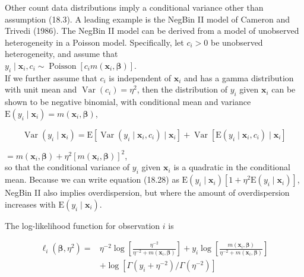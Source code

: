 \documentclass[10pt]{article}
\begin{document}
Other count data distributions imply a conditional variance other than assumption (18.3). A leading example is the NegBin II model of Cameron and Trivedi (1986). The NegBin II model can be derived from a model of unobserved heterogeneity in a Poisson model. Specifically, let $c_{i}>0$ be unobserved heterogeneity, and assume that\\
$y_{i} \mid \mathbf{x}_{i}, c_{i} \sim \operatorname{Poisson}\left[c_{i} m\left(\mathbf{x}_{i}, \boldsymbol{\beta}\right)\right]$.\\
If we further assume that $c_{i}$ is independent of $\mathbf{x}_{i}$ and has a gamma distribution with unit mean and $\operatorname{Var}\left(c_{i}\right)=\eta^{2}$, then the distribution of $y_{i}$ given $\mathbf{x}_{i}$ can be shown to be negative binomial, with conditional mean and variance\\
$\mathrm{E}\left(y_{i} \mid \mathbf{x}_{i}\right)=m\left(\mathbf{x}_{i}, \boldsymbol{\beta}\right)$,


\begin{equation*}
\operatorname{Var}\left(y_{i} \mid \mathbf{x}_{i}\right)=\mathrm{E}\left[\operatorname{Var}\left(y_{i} \mid \mathbf{x}_{i}, c_{i}\right) \mid \mathbf{x}_{i}\right]+\operatorname{Var}\left[\mathrm{E}\left(y_{i} \mid \mathbf{x}_{i}, c_{i}\right) \mid \mathbf{x}_{i}\right] \tag{18.27}
\end{equation*}


$=m\left(\mathbf{x}_{i}, \boldsymbol{\beta}\right)+\eta^{2}\left[m\left(\mathbf{x}_{i}, \boldsymbol{\beta}\right)\right]^{2}$,\\
so that the conditional variance of $y_{i}$ given $\mathbf{x}_{i}$ is a quadratic in the conditional mean. Because we can write equation (18.28) as $\mathrm{E}\left(y_{i} \mid \mathbf{x}_{i}\right)\left[1+\eta^{2} \mathrm{E}\left(y_{i} \mid \mathbf{x}_{i}\right)\right]$, NegBin II also implies overdispersion, but where the amount of overdispersion increases with $\mathrm{E}\left(y_{i} \mid \mathbf{x}_{i}\right)$.

The log-likelihood function for observation $i$ is


\begin{align*}
\ell_{i}\left(\boldsymbol{\beta}, \eta^{2}\right)= & \eta^{-2} \log \left[\frac{\eta^{-2}}{\eta^{-2}+m\left(\mathbf{x}_{i}, \boldsymbol{\beta}\right)}\right]+y_{i} \log \left[\frac{m\left(\mathbf{x}_{i}, \boldsymbol{\beta}\right)}{\eta^{-2}+m\left(\mathbf{x}_{i}, \boldsymbol{\beta}\right)}\right] \\
& +\log \left[\Gamma\left(y_{i}+\eta^{-2}\right) / \Gamma\left(\eta^{-2}\right)\right] \tag{18.29}
\end{align*}
\end{document}
